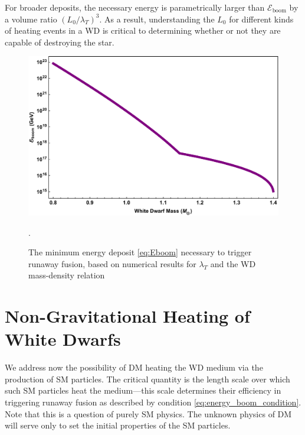 \documentclass[twocolumn, preprintnumbers,amsmath,amssymb,prd, superscriptaddress]{revtex4}
\newcommand{\Eboom}{\mathcal{E}_\text{boom}}
\begin{document}
For broader deposits, the necessary energy is parametrically larger than $\Eboom$ by a volume ratio $(L_0/\lambda_T)^3$.
As a result, understanding the $L_0$ for different kinds of heating events in a WD is critical to determining whether or not they are capable of destroying the star.
\begin{figure}
\includegraphics[scale=.3]{Eboom.pdf}
\caption{The minimum energy deposit \eqref{eq:Eboom} necessary to trigger runaway fusion, based on numerical results for $\lambda_T$ \cite{Woosley} and the WD mass-density relation \cite{cococubed}}.
\label{fig:Eboom}
\end{figure}

\section{Non-Gravitational Heating of White Dwarfs}
\label{sec:SMHeating}

We address now the possibility of DM heating the WD medium via the production of SM particles.
The critical quantity is the length scale over which such SM particles heat the medium---this scale determines their efficiency in triggering runaway fusion as described by condition \eqref{eq:energy_boom_condition}.
Note that this is a question of purely SM physics.
The unknown physics of DM will serve only to set the initial properties of the SM particles.
\end{document}
